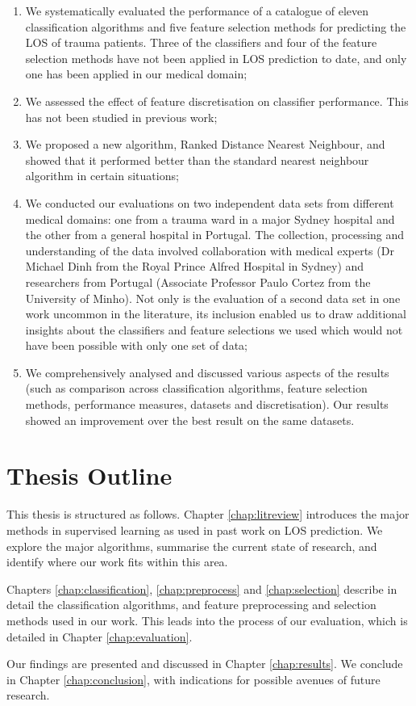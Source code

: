 \begin{enumerate}
\item We systematically evaluated the performance of a catalogue of eleven
classification algorithms and five feature selection methods for predicting the
LOS of trauma patients. Three of the classifiers and four of the feature
selection methods have not been applied in LOS prediction to date, and only
one has been applied in our medical domain;

\item We assessed the effect of feature discretisation on classifier
performance. This has not been studied in previous work;

\item We proposed a new algorithm, Ranked Distance Nearest Neighbour, and
showed that it performed better than the standard nearest neighbour algorithm
in certain situations;

\item We conducted our evaluations on two independent data sets from different
medical domains: one from a trauma ward in a major Sydney hospital and the other
from a general hospital in Portugal. The collection, processing and
understanding of the data involved collaboration with medical experts (Dr
Michael Dinh from the Royal Prince Alfred Hospital in Sydney) and researchers
from Portugal (Associate Professor Paulo Cortez from the University of Minho).
Not only is the evaluation of a second data set in one work uncommon in the
literature, its inclusion enabled us to draw
additional insights about the classifiers and feature selections we used
which would not have been possible with only one set of data;

\item We comprehensively analysed and discussed various aspects of the results
(such as comparison across classification algorithms, feature selection
methods, performance measures, datasets and discretisation). Our results showed
an improvement over the best result on the same datasets.
\end{enumerate}

\section{Thesis Outline}
This thesis is structured as follows. Chapter \ref{chap:litreview} introduces
the major methods in supervised learning as used in past work on LOS
prediction. We explore the major algorithms, summarise the current state of
research, and identify where our work fits within this area.

Chapters \ref{chap:classification}, \ref{chap:preprocess} and
\ref{chap:selection} describe in detail the classification algorithms, and
feature preprocessing and selection methods used in our work. This leads into
the process of our evaluation, which is detailed in Chapter
\ref{chap:evaluation}.

Our findings are presented and discussed in Chapter \ref{chap:results}.
We conclude in Chapter \ref{chap:conclusion}, with indications for possible
avenues of future research.
